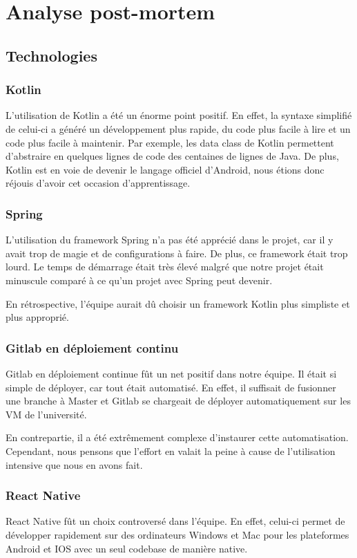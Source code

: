 \section{Analyse post-mortem}
    \subsection{Technologies}
        \subsubsection{Kotlin}
        L'utilisation de Kotlin a été un énorme point positif. En effet, la syntaxe simplifié de celui-ci a généré un développement plus rapide, du code plus facile à lire et un code plus facile à maintenir. Par exemple, les data class de Kotlin permettent d'abstraire en quelques lignes de code des centaines de lignes de Java. De plus, Kotlin est en voie de devenir le langage officiel d'Android, nous étions donc réjouis d'avoir cet occasion d'apprentissage.
        
        \subsubsection{Spring}
        L'utilisation du framework Spring n'a pas été apprécié dans le projet, car il y avait trop de magie et de configurations à faire. De plus, ce framework était trop lourd. Le temps de démarrage était très élevé malgré que notre projet était minuscule comparé à ce qu'un projet avec Spring peut devenir.
        
        En rétrospective, l'équipe aurait dû choisir un framework Kotlin plus simpliste et plus approprié.

        \subsubsection{Gitlab en déploiement continu}
        Gitlab en déploiement continue fût un net positif dans notre équipe. Il était si simple de déployer, car tout était automatisé. En effet, il suffisait de fusionner une branche à Master et Gitlab se chargeait de déployer automatiquement sur les VM de l'université.

        En contrepartie, il a été extrêmement complexe d'instaurer cette automatisation. Cependant, nous pensons que l'effort en valait la peine à cause de l'utilisation intensive que nous en avons fait.
        
        \subsubsection{React Native}
        React Native fût un choix controversé dans l'équipe. En effet, celui-ci permet de développer rapidement sur des ordinateurs Windows et Mac pour les plateformes Android et IOS avec un seul codebase de manière native.


